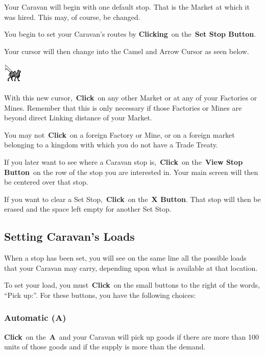 Your Caravan will begin with one default stop. That is the Market at which it was hired. This may, of course, be changed.

You begin to set your Caravan’s routes by \textbf{Clicking} on the \textbf{Set Stop Button}.

Your cursor will then change into the Camel and Arrow Cursor as seen below.

\includegraphics[width=0.1\linewidth]{Bcamel}


With this new cursor, \textbf{Click} on any other Market or at any of your Factories or Mines. Remember that this is only necessary if those Factories or Mines are beyond direct Linking distance of your Market.

You may not \textbf{Click} on a foreign Factory or Mine, or on a foreign market belonging to a kingdom with which you do not have a Trade Treaty.

If you later want to see where a Caravan stop is, \textbf{Click} on the \textbf{View Stop Button} on the row of the stop you are interested in. Your main screen will then be centered over that stop.

If you want to clear a Set Stop, \textbf{Click} on the \textbf{X Button}. That stop will then be erased and the space left empty for another Set Stop.

\subsection{Setting Caravan’s Loads}


When a stop has been set, you will see on the same line all the possible loads that your Caravan may carry, depending upon what is available at that location.

To set your load, you must \textbf{Click} on the small buttons to the right of the words, “Pick up:”. For these buttons, you have the following choices:

\subsubsection{Automatic (A)}

\textbf{Click} on the \textbf{A} and your Caravan will pick up goods if there are more than 100 units of those goods and if the supply is more than the demand.

